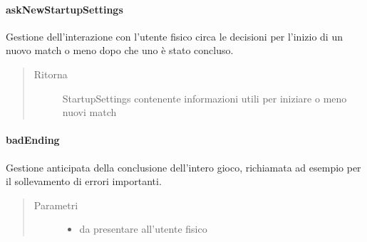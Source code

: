 \documentclass[letterpaper,10pt,italian,openany,oneside]{sphinxmanual}
\begin{document}
\paragraph{askNewStartupSettings}
\label{\detokenize{test/it/unicam/cs/pa/mastermind/ui/StartView:asknewstartupsettings}}

\begin{fulllineitems}
\label{\detokenize{test/it/unicam/cs/pa/mastermind/ui/StartView:it.unicam.cs.pa.mastermind.ui.StartView.askNewStartupSettings()}}
Gestione dell’interazione con l’utente fisico circa le decisioni per l’inizio di un nuovo match o meno dopo che uno è stato concluso.
\begin{quote}\begin{description}
\item[{Ritorna}] \leavevmode
StartupSettings contenente informazioni utili per iniziare o meno nuovi match

\end{description}\end{quote}

\end{fulllineitems}



\paragraph{badEnding}
\label{\detokenize{test/it/unicam/cs/pa/mastermind/ui/StartView:badending}}

\begin{fulllineitems}
\label{\detokenize{test/it/unicam/cs/pa/mastermind/ui/StartView:it.unicam.cs.pa.mastermind.ui.StartView.badEnding(String)}}
Gestione anticipata della conclusione dell’intero gioco, richiamata ad esempio per il sollevamento di errori importanti.
\begin{quote}\begin{description}
\item[{Parametri}] \leavevmode\begin{itemize}
\item {} 
 \textendash{} da presentare all’utente fisico

\end{itemize}

\end{description}\end{quote}

\end{fulllineitems}
\end{document}
